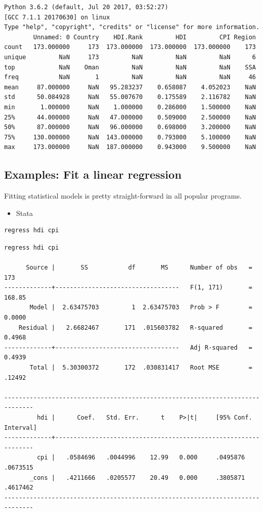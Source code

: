 \documentclass[]{book}
\providecommand{\tightlist}{%
  \setlength{\itemsep}{0pt}\setlength{\parskip}{0pt}}
\begin{document}
\begin{verbatim}
Python 3.6.2 (default, Jul 20 2017, 03:52:27) 
[GCC 7.1.1 20170630] on linux
Type "help", "copyright", "credits" or "license" for more information.
        Unnamed: 0 Country    HDI.Rank         HDI         CPI Region
count   173.000000     173  173.000000  173.000000  173.000000    173
unique         NaN     173         NaN         NaN         NaN      6
top            NaN    Oman         NaN         NaN         NaN    SSA
freq           NaN       1         NaN         NaN         NaN     46
mean     87.000000     NaN   95.283237    0.658087    4.052023    NaN
std      50.084928     NaN   55.007670    0.175589    2.116782    NaN
min       1.000000     NaN    1.000000    0.286000    1.500000    NaN
25%      44.000000     NaN   47.000000    0.509000    2.500000    NaN
50%      87.000000     NaN   96.000000    0.698000    3.200000    NaN
75%     130.000000     NaN  143.000000    0.793000    5.100000    NaN
max     173.000000     NaN  187.000000    0.943000    9.500000    NaN
\end{verbatim}

\subsection{Examples: Fit a linear
regression}\label{examples-fit-a-linear-regression}

Fitting statistical models is pretty straight-forward in all popular
programs.

\begin{itemize}
\tightlist
\item
  Stata
\end{itemize}

\begin{verbatim}
regress hdi cpi
\end{verbatim}

\begin{verbatim}
regress hdi cpi

      Source |       SS           df       MS      Number of obs   =       173
-------------+----------------------------------   F(1, 171)       =    168.85
       Model |  2.63475703         1  2.63475703   Prob > F        =    0.0000
    Residual |   2.6682467       171  .015603782   R-squared       =    0.4968
-------------+----------------------------------   Adj R-squared   =    0.4939
       Total |  5.30300372       172  .030831417   Root MSE        =    .12492

------------------------------------------------------------------------------
         hdi |      Coef.   Std. Err.      t    P>|t|     [95% Conf. Interval]
-------------+----------------------------------------------------------------
         cpi |   .0584696   .0044996    12.99   0.000     .0495876    .0673515
       _cons |   .4211666   .0205577    20.49   0.000     .3805871    .4617462
------------------------------------------------------------------------------
\end{verbatim}
\end{document}
